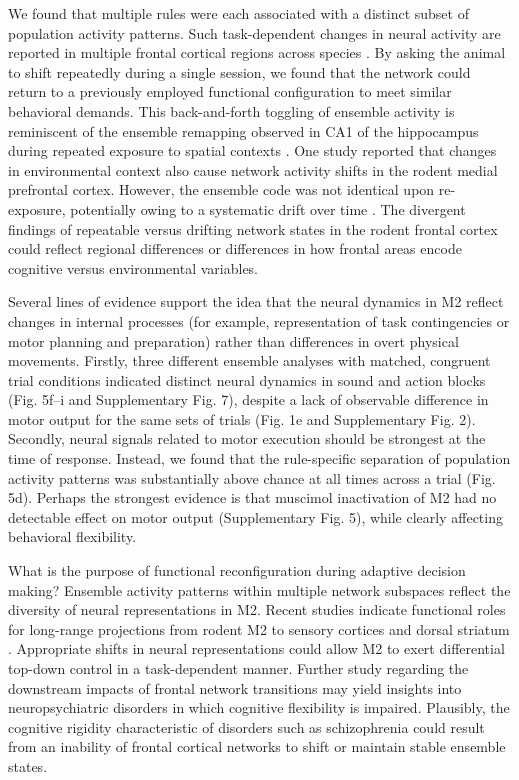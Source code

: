 We found that multiple rules were each associated with a distinct subset of population activity patterns. Such task-dependent changes in neural activity are reported in multiple frontal cortical regions across species \citep{asaad2000task,rich2009rat,rodgers2014neural,durstewitz2010abrupt,wallis2001single}. By asking the animal to shift repeatedly during a single session, we found that the network could return to a previously employed functional configuration to meet similar behavioral demands. This back-and-forth toggling of ensemble activity is reminiscent of the ensemble remapping observed in CA1 of the hippocampus during repeated exposure to spatial contexts \citep{wills2005attractor,leutgeb2005independent}. One study reported that changes in environmental context also cause network activity shifts in the rodent medial prefrontal cortex. However, the ensemble code was not identical upon re-exposure, potentially owing to a systematic drift over time \citep{hyman2012contextual}. The divergent findings of repeatable versus drifting network states in the rodent frontal cortex could reflect regional differences or differences in how frontal areas encode cognitive versus environmental variables.

Several lines of evidence support the idea that the neural dynamics in M2 reflect changes in internal processes (for example, representation of task contingencies or motor planning and preparation) rather than differences in overt physical movements. Firstly, three different ensemble analyses with matched, congruent trial conditions indicated distinct neural dynamics in sound and action blocks (Fig. 5f–i and Supplementary Fig. 7), despite a lack of observable difference in motor output for the same sets of trials (Fig. 1e and Supplementary Fig. 2). Secondly, neural signals related to motor execution should be strongest at the time of response. Instead, we found that the rule-specific separation of population activity patterns was substantially above chance at all times across a trial (Fig. 5d). Perhaps the strongest evidence is that muscimol inactivation of M2 had no detectable effect on motor output (Supplementary Fig. 5), while clearly affecting behavioral flexibility.

What is the purpose of functional reconfiguration during adaptive decision making? Ensemble activity patterns within multiple network subspaces reflect the diversity of neural representations in M2. Recent studies indicate functional roles for long-range projections from rodent M2 to sensory cortices \citep{schneider2014synaptic,manita2015top} and dorsal striatum \citep{rothwell2015input}. Appropriate shifts in neural representations could allow M2 to exert differential top-down control in a task-dependent manner. Further study regarding the downstream impacts of frontal network transitions may yield insights into neuropsychiatric disorders in which cognitive flexibility is impaired. Plausibly, the cognitive rigidity characteristic of disorders such as schizophrenia could result from an inability of frontal cortical networks to shift or maintain stable ensemble states.